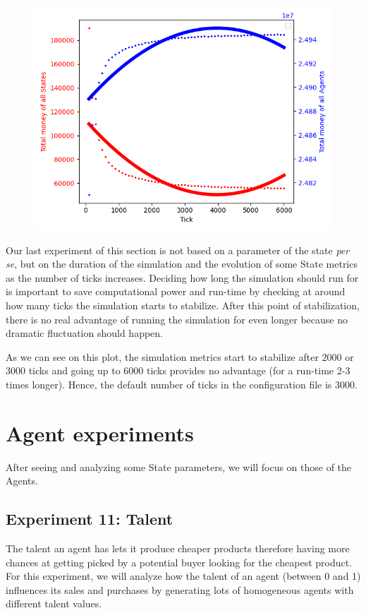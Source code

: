 {{{{{{{{{{        \begin{figure}
            \includegraphics[width=\linewidth]{img/exp/10_2.png}
        \end{figure} 
        { Our last experiment of this section is not based on a parameter of the state \emph{per se}, but on the duration of the simulation and the evolution of some State metrics as the number of ticks increases. Deciding how long the simulation should run for is important to save computational power and run-time by checking at around how many ticks the simulation starts to stabilize. After this point of stabilization, there is no real advantage of running the simulation for even longer because no dramatic fluctuation should happen. 
            
        As we can see on this plot, the simulation metrics start to stabilize after 2000 or 3000 ticks and going up to 6000 ticks provides no advantage (for a run-time 2-3 times longer). Hence, the default number of ticks in the configuration file is 3000.
        \par
    
\section{Agent experiments}
    After seeing and analyzing some State parameters, we will focus on those of the Agents.

    \subsection{Experiment 11: Talent}
    The talent an agent has lets it produce cheaper products therefore having more chances at getting picked by a potential buyer looking for the cheapest product. For this experiment, we will analyze how the talent of an agent (between 0 and 1) influences its sales and purchases by generating lots of homogeneous agents with different talent values.

}}}}}}}}}}}
